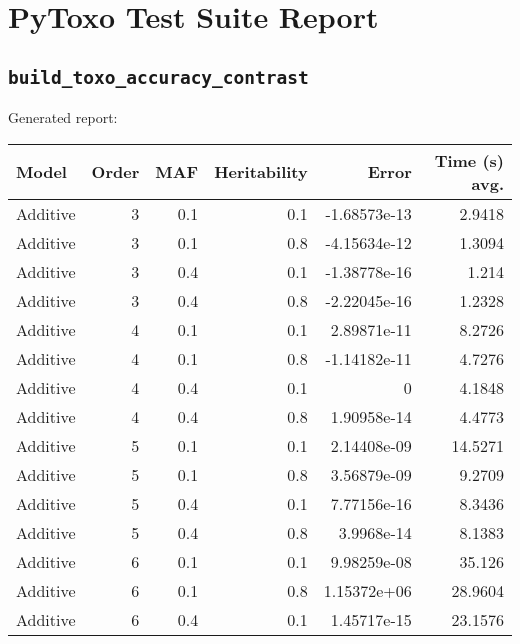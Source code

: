\documentclass{article}
\begin{document}
\section*{PyToxo Test Suite Report}
\subsection*{\texttt{build\_toxo\_accuracy\_contrast}}
Generated report:

\begin{longtable}[H]{lrrrrr}
\hline
 Model          &   Order &   MAF &   Heritability &            Error &   Time (s) avg. \\
\hline
 Additive       &       3 &   0.1 &            0.1 &     -1.68573e-13 &          2.9418 \\
 Additive       &       3 &   0.1 &            0.8 &     -4.15634e-12 &          1.3094 \\
 Additive       &       3 &   0.4 &            0.1 &     -1.38778e-16 &          1.214  \\
 Additive       &       3 &   0.4 &            0.8 &     -2.22045e-16 &          1.2328 \\
 Additive       &       4 &   0.1 &            0.1 &      2.89871e-11 &          8.2726 \\
 Additive       &       4 &   0.1 &            0.8 &     -1.14182e-11 &          4.7276 \\
 Additive       &       4 &   0.4 &            0.1 &      0           &          4.1848 \\
 Additive       &       4 &   0.4 &            0.8 &      1.90958e-14 &          4.4773 \\
 Additive       &       5 &   0.1 &            0.1 &      2.14408e-09 &         14.5271 \\
 Additive       &       5 &   0.1 &            0.8 &      3.56879e-09 &          9.2709 \\
 Additive       &       5 &   0.4 &            0.1 &      7.77156e-16 &          8.3436 \\
 Additive       &       5 &   0.4 &            0.8 &      3.9968e-14  &          8.1383 \\
 Additive       &       6 &   0.1 &            0.1 &      9.98259e-08 &         35.126  \\
 Additive       &       6 &   0.1 &            0.8 &      1.15372e+06 &         28.9604 \\
 Additive       &       6 &   0.4 &            0.1 &      1.45717e-15 &         23.1576 \\

\end{longtable}
\end{document}
